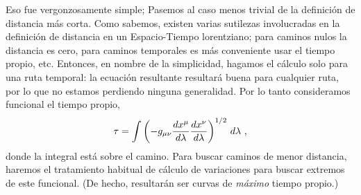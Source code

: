 \documentclass[11pt,b5paper,openany,twoside]{book}
\newcommand{\mn}{{\mu\nu}}
\begin{document}
Eso fue vergonzosamente simple; Pasemos al caso menos trivial de la definición de distancia más corta.
Como sabemos, existen varias sutilezas involucradas en la definición de distancia en un Espacio-Tiempo lorentziano; para caminos nulos la distancia es cero, para caminos temporales es más conveniente usar el tiempo propio, etc.
Entonces, en nombre de la simplicidad, hagamos el cálculo solo para una ruta temporal: la ecuación resultante resultará buena para cualquier ruta, por lo que no estamos perdiendo ninguna generalidad.
Por lo tanto consideramos funcional el tiempo propio,
\begin{equation}
\tau = \int \left(-g_\mn {{dx^\mu}\over{d\lambda}}
{{dx^\nu}\over{d\lambda}}\right)^{1/2}\, d\lambda\ ,\label{3.48}
\end{equation}
donde la integral está sobre el camino.
Para buscar caminos de menor distancia, haremos el tratamiento habitual de cálculo de variaciones para buscar extremos de este funcional.
(De hecho, resultarán ser curvas de {\it máximo} tiempo propio.)
\end{document}
